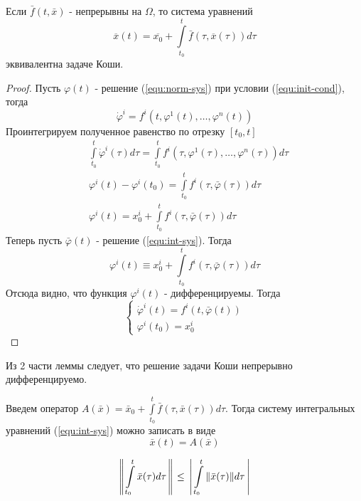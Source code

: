 	\begin{lemma}
		Если $\bar{f}(t, \bar{x})$ - непрерывны на $\Omega$, то система уравнений
		\begin{equation}
			\label{equ:int-sys}
			\overline{x}(t) = \overline{x_0} + \int\limits_{t_0}^t\bar{f}(\tau, \overline{x}(\tau))d\tau
		\end{equation}
		эквивалентна задаче Коши.
	\end{lemma}

	\begin{proof}
		Пусть $\varphi(t)$ - решение (\ref{equ:norm-sys}) при условии (\ref{equ:init-cond}), тогда
		\[
			\dot{\varphi}^i = f^i(t, \varphi^1(t), \dots, \varphi^n(t))
		\]
		Проинтегрируем полученное равенство по отрезку $[t_0, t]$
		\begin{align*}
			&\int\limits_{t_0}^t \dot{\varphi}^i(\tau)d\tau = \int\limits_{t_0}^t f^i(\tau, \varphi^1(\tau), \dots, \varphi^n(\tau)) d\tau \\
			&\varphi^i(t) - \varphi^i(t_0) = \int\limits_{t_0}^t f^i(\tau, \bar\varphi(\tau))d\tau \\
			&\varphi^i(t) = x_0^i + \int\limits_{t_0}^t f^i(\tau, \bar\varphi(\tau))d\tau
		\end{align*}
		Теперь пусть $\bar{\varphi}(t)$ - решение (\ref{equ:int-sys}). Тогда
		\[
			\varphi^i(t) \equiv x_0^i + \int\limits_{t_0}^t f^i(\tau, \bar{\varphi}(\tau))d\tau
		\]
		Отсюда видно, что функция $\varphi^i(t)$ - дифференцируемы. Тогда
		\begin{equation*}
		\begin{cases*}
			\dot{\varphi}^i(t) = f^i(t, \bar{\varphi}(t)) \\
			\varphi^i(t_0) = x_0^i
		\end{cases*}
		\end{equation*}
	\end{proof}

	\begin{corollary}
		Из 2 части леммы следует, что решение задачи Коши непрерывно дифференцируемо.
	\end{corollary}

	Введем оператор $A(\bar{x}) = \bar{x}_0 + \int\limits_{t_0}^t \bar{f}(\tau, \bar{x}(\tau)) d\tau$. Тогда систему интегральных уравнений (\ref{equ:int-sys}) можно записать в виде 
	\begin{equation}
		\label{equ:altern}
		\bar{x}(t) = A(\bar{x})
	\end{equation}
	
	\begin{lemma}
		\[
		\left\Arrowvert \int\limits_{t_0}^t\bar{x}(\tau)d\tau \right\Arrowvert \le \left\arrowvert \int\limits_{t_0}^t \Arrowvert \bar{x}(\tau)\Arrowvert d\tau \right\arrowvert
		\]
	\end{lemma}


